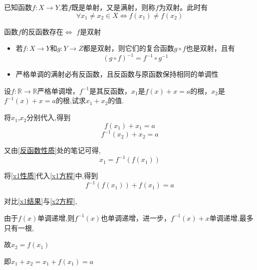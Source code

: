 \begin{definition}[双射]
    已知函数$f:X\rightarrow Y$,若$f$既是单射，又是满射，则称$f$为双射。此时有
    \begin{equation*}
        \forall x_1 \ne x_2\in X \Longleftrightarrow f(x_1) \ne f(x_2)
    \end{equation*}
\end{definition}

\begin{theorem}[反函数存在的充分必要条件]
    函数$f$的反函数存在$\Longleftrightarrow$ $f$是双射
\end{theorem}

\begin{note}
    \begin{itemize}
        \item 若$f:X \rightarrow Y$和$g:Y\rightarrow Z$都是双射，则它们的复合函数$g\circ f$也是双射，且有
              \begin{equation*}
                  (g\circ f)^{-1}=f^{-1}\circ g^{-1}
              \end{equation*}

        \item 严格单调的满射必有反函数，且反函数与原函数保持相同的单调性
    \end{itemize}
\end{note}

\newpage

\begin{example}
    设$f:\mathbb{R} \rightarrow \mathbb{R}$严格单调增，$f^{-1}$是其反函数，$x_1$是$f(x)+x=a$的根，$x_2$是$f^{-1}(x)+x=a$的根,试求$x_1+x_2$的值.
\end{example}

\begin{solution}

    将$x_1$,$x_2$分别代入,得到
    \begin{equation}
        f(x_1)+x_1=a \label{x1方程}
    \end{equation}
    \begin{equation}
        f^{-1}(x_2)+x_2=a \label{x2方程}
    \end{equation}

    又由\ref{反函数性质}处的笔记可得,
    \begin{equation}
        x_1=f^{-1}(f(x_1)) \label{x1性质}
    \end{equation}

    将\cref{x1性质}代入\cref{x1方程}中,得到
    \begin{equation}
        f^{-1}(f(x_1))+f(x_1)=a \label{x1结果}
    \end{equation}

    对比\cref{x1结果}与\cref{x2方程},

    由于$f(x)$单调递增,则$f^{-1}(x)$也单调递增，进一步，$f^{-1}(x)+x$单调递增,最多只有一根,

    故$x_2=f(x_1)$

    即$x_1+x_2=x_1+f(x_1)=a$
\end{solution}

